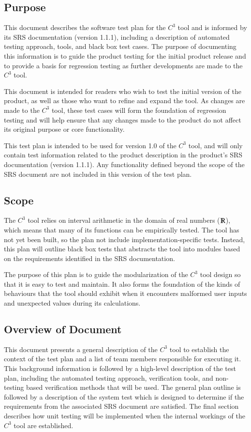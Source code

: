 \documentclass[12pt, titlepage]{article}
\newcommand{\prognameAbbrv}{$C^{3}$}
\newcommand{\srsVersion}{1.1.1}
\begin{document}
\subsection{Purpose}
This document describes the software test plan for the \prognameAbbrv{} tool 
and is informed by its SRS documentation (version \srsVersion{}), including a 
description of automated testing approach, tools, and black box test cases. The 
purpose of documenting this information is to guide the product testing for the 
initial product release and to provide a basis for regression testing as 
further developments are made to the \prognameAbbrv{} tool.

This document is intended for readers who wish to test the initial version of 
the product, as well as those who want to refine and expand the tool. As 
changes are made to the \prognameAbbrv{} tool, these test cases will form the 
foundation of regression testing and will help ensure that any changes made to 
the product do not affect its original purpose or core functionality.

This test plan is intended to be used for version 1.0 of the \prognameAbbrv{} 
tool, and will only contain test information related to the product description 
in the product's SRS documentation (version \srsVersion{}). Any functionality 
defined beyond the scope of the SRS document are not included in this version 
of the test plan.

\subsection{Scope}
The \prognameAbbrv{} tool relies on interval arithmetic in the domain of real 
numbers ($\varmathbb{R}$), which means that many of its functions can be 
empirically tested. The tool has not yet been built, so the plan not include 
implementation-specific tests. Instead, this plan will outline black box tests 
that abstracts the tool into modules based on the requirements identified in 
the SRS documentation.

The purpose of this plan is to guide the modularization of the \prognameAbbrv{} 
tool design so that it is easy to test and maintain. It also forms the 
foundation of the kinds of behaviours that the tool should exhibit when it 
encounters malformed  user inputs and unexpected values during its calculations.

\subsection{Overview of Document}
This document presents a general description of the \prognameAbbrv{} tool to 
establish the context of the test plan and a list of team members responsible 
for executing it. This background information is followed by a high-level 
description of the test plan, including the automated testing approach, 
verification tools, and non-testing based verification methods that will be 
used. The general plan outline is followed by a description of the system test 
which is designed to determine if the requirements from the associated SRS 
document are satisfied. The final section describes how unit testing will be 
implemented when the internal workings of the \prognameAbbrv{} tool are 
established.
\end{document}
